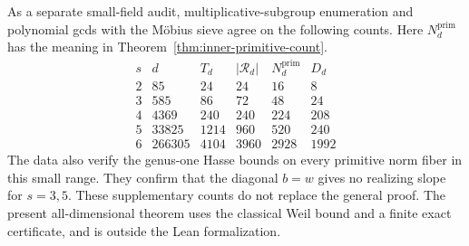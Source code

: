 \documentclass[11pt]{article}
\begin{document}
As a separate small-field audit, multiplicative-subgroup enumeration
and polynomial gcds with the M\"obius sieve agree on the following
counts. Here $N_d^{\mathrm{prim}}$ has the meaning in
Theorem~\ref{thm:inner-primitive-count}.
\[
\begin{array}{c|r|r|r|r|r}
s&d&T_d&|\mathcal R_d|&N_d^{\mathrm{prim}}&D_d\\\hline
2&85&24&24&16&8\\
3&585&86&72&48&24\\
4&4369&240&240&224&208\\
5&33825&1214&960&520&240\\
6&266305&4104&3960&2928&1992
\end{array}
\]
The data also verify the genus-one Hasse bounds on every primitive
norm fiber in this small range. They confirm that the diagonal
$b=w$ gives no realizing slope for $s=3,5$.
These supplementary counts do not replace the general proof.
The present all-dimensional theorem uses the classical Weil bound
and a finite exact certificate, and is outside the Lean formalization.
\end{document}
